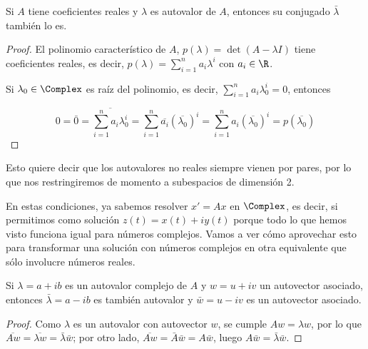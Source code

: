 \documentclass[../main.tex]{subfiles}
\begin{document}
  \begin{proposition}
    Si \(A\) tiene coeficientes reales y \(\lambda\) es autovalor de \(A\),
    entonces su conjugado \(\bar{\lambda}\) también lo es.
    \begin{proof}
      El polinomio característico de \(A\), \(p(\lambda) = \det(A-\lambda I)\)
      tiene coeficientes reales, es decir, \(p(\lambda) = \sum_{i=1}^n
      a_i\lambda^i\) con \(a_i \in \R\).

      Si \(\lambda_0 \in \Complex\) es raíz del polinomio, es decir, \(\sum_{i=1}^n
      a_i\lambda_0^i = 0\), entonces

      \[0 = \bar{0} = \overline{\sum_{i=1}^n a_i\lambda_0^i} = \sum_{i=1}^n
        \overline{a_i}(\overline{\lambda_0})^i = \sum_{i=1}^n
        a_i(\overline{\lambda_0})^i = p(\overline{\lambda_0})\]
    \end{proof}
  \end{proposition}

  \begin{remark}
    Esto quiere decir que los autovalores no reales siempre vienen por pares,
    por lo que nos restringiremos de momento a subespacios de dimensión 2.
  \end{remark}

  \begin{remark}
    En estas condiciones, ya sabemos resolver \(x' = Ax\) en \(\Complex\), es
    decir, si permitimos como solución \(z(t) = x(t) + iy(t)\) porque todo lo
    que hemos visto funciona igual para números complejos. Vamos a ver cómo
    aprovechar esto para transformar una solución con números complejos en otra
    equivalente que sólo involucre números reales.
  \end{remark}

  \begin{proposition}
    Si \(\lambda = a + ib\) es un autovalor complejo de \(A\) y \(w = u + iv\)
    un autovector asociado, entonces \(\bar{\lambda} = a - ib\) es también
    autovalor y \(\bar{w} = u - iv\) es un autovector asociado.
    \begin{proof}
      Como \(\lambda\) es un autovalor con autovector \(w\), se cumple
      \(Aw = \lambda w\), por lo que
      \(\overline{Aw} = \overline{\lambda w} = \bar{\lambda} \bar{w}\); por otro
      lado, \(\overline{Aw} = \bar{A} \bar{w} = A \bar{w}\), luego \(A \bar{w} =
      \bar{\lambda} \bar{w}\).
    \end{proof}
  \end{proposition}
\end{document}
